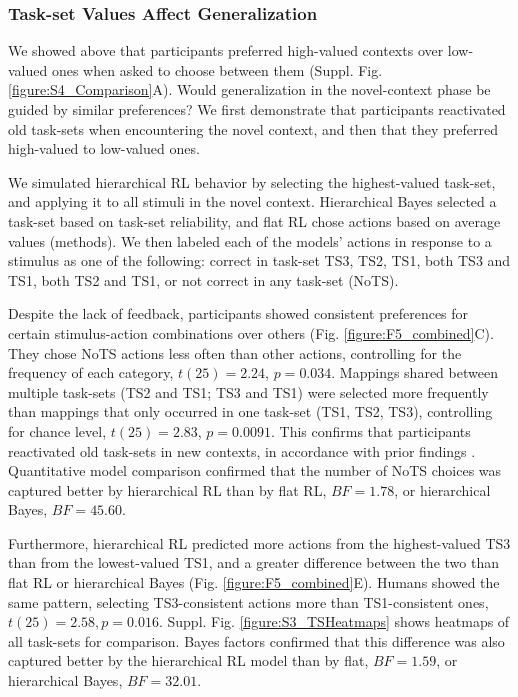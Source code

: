 \documentclass[10pt,letterpaper]{article}  %
\newcommand{\rev}{\color{black}}
\begin{document}
\subsubsection*{Task-set Values Affect Generalization}

We showed above that participants preferred high-valued contexts over low-valued ones when asked to choose between them (Suppl. Fig. \ref{figure:S4_Comparison}A). 
Would generalization in the novel-context phase be guided by similar preferences? We first demonstrate that participants reactivated old task-sets when encountering the novel context, and then that they preferred high-valued to low-valued ones.

We simulated hierarchical RL behavior by selecting the highest-valued task-set, and applying it to all stimuli in the novel context. Hierarchical Bayes selected a task-set based on task-set reliability, and flat RL chose actions based on average values (methods).
We then labeled each of the models' actions in response to a stimulus as one of the following: correct in task-set TS3, TS2, TS1, both TS3 and TS1, both TS2 and TS1, or not correct in any task-set (NoTS).

Despite the lack of feedback, participants showed consistent preferences for certain stimulus-action combinations over others (Fig. \ref{figure:F5_combined}C). They chose NoTS actions less often than other actions, controlling for the frequency of each category, $t(25)=2.24$, $p=0.034$. Mappings shared between multiple task-sets (TS2 and TS1; TS3 and TS1) were selected more frequently than mappings that only occurred in one task-set (TS1, TS2, TS3), controlling for chance level, $t(25)=2.83$, $p=0.0091$. This confirms that participants reactivated old task-sets in new contexts, in accordance with prior findings \cite{collins_cognitive_2013}.
{\rev Quantitative model comparison confirmed that the number of NoTS choices was captured better by hierarchical RL than by flat RL, $BF=1.78$, or hierarchical Bayes, $BF=45.60$.}

Furthermore, hierarchical RL predicted more actions from the highest-valued TS3 than from the lowest-valued TS1, and a greater difference between the two than flat RL or hierarchical Bayes (Fig. \ref{figure:F5_combined}E).
Humans showed the same pattern, selecting TS3-consistent actions more than TS1-consistent ones, $t(25)=2.58, p=0.016$. Suppl. Fig. \ref{figure:S3_TSHeatmaps} shows heatmaps of all task-sets for comparison.
Bayes factors confirmed that this difference was also captured better by the hierarchical RL model than by flat, $BF=1.59$, or hierarchical Bayes, $BF=32.01$.
\end{document}
